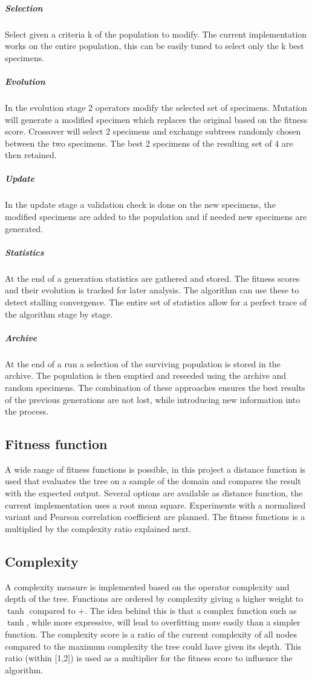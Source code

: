 \documentclass[10pt]{extarticle}
\begin{document}
\subparagraph{Selection}
Select given a criteria k of the population to modify. The current implementation works on the entire population, this can be easily tuned to select only the k best specimens.

\subparagraph{Evolution}
In the evolution stage 2 operators modify the selected set of specimens.
Mutation will generate a modified specimen which replaces the original based on the fitness score.
Crossover will select 2 specimens and exchange subtrees randomly chosen between the two specimens. The best 2 specimens of the resulting set of 4 are then retained.

\subparagraph{Update}
In the update stage a validation check is done on the new specimens, the modified specimens are added to the population and if needed new specimens are generated.

\subparagraph{Statistics}
At the end of a generation statistics are gathered and stored. The fitness scores and their evolution is tracked for later analysis.
The algorithm can use these to detect stalling convergence.
The entire set of statistics allow for a perfect trace of the algorithm stage by stage.

\subparagraph{Archive}
At the end of a run a selection of the surviving population is stored in the archive. 
The population is then emptied and reseeded using the archive and random specimens. The combination of these approaches ensures the best results of the previous generations are not lost, while introducing new information into the process.


\subsection{Fitness function}
A wide range of fitness functions is possible, in this project a distance function is used that evaluates the tree on a sample of the domain and compares the result with the expected output. 
Several options are available as distance function, the current implementation uses a root mean square. Experiments with a normalized variant and Pearson correlation coefficient are planned. 
The fitness functions is a multiplied by the complexity ratio explained next.

\subsection{Complexity}
A complexity measure is implemented based on the operator complexity and depth of the tree. Functions are ordered by complexity giving a higher weight to $\tanh$ compared to $+$. The idea behind this is that a complex function such as $\tanh$, while more expressive, will lead to overfitting more easily than a simpler function. The complexity score is a ratio of the current complexity of all nodes compared to the maximum complexity the tree could have given its depth. This ratio (within [1,2]) is used as a multiplier for the fitness score to influence the algorithm. 
\end{document}
